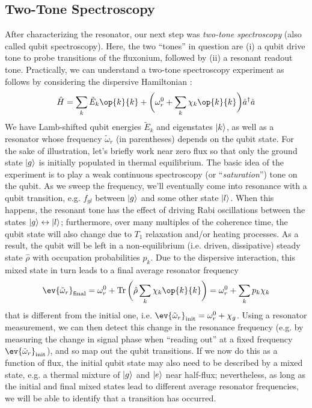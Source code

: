 \subsection{Two-Tone Spectroscopy}
After characterizing the resonator, our next step was \textit{two-tone spectroscopy} (also called qubit spectroscopy). Here, the two ``tones'' in question are (i) a qubit drive tone to probe transitions of the fluxonium, followed by (ii) a resonant readout tone. Practically, we can understand a two-tone spectroscopy experiment as follows by considering the dispersive Hamiltonian \cite{zhu2013cQEDfluxonium}:
\begin{equation}
    \hat{H} = \sum_k \tilde{E}_k \op{k}{k} + \bigg(\omega_r^0 + \sum_k \chi_k \op{k}{k}\bigg) \hat{a}^\dagger\hat{a}
\end{equation}
We have Lamb-shifted qubit energies $\tilde{E}_k$ and eigenstates $\lvert k\rangle$, as well as a resonator whose frequency $\tilde{\omega}_r$ (in parentheses) depends on the qubit state. For the sake of illustration, let's briefly work near zero flux so that only the ground state $\lvert g\rangle$ is initially populated in thermal equilibrium. The basic idea of the experiment is to play a weak continuous spectroscopy (or ``\textit{saturation}'') tone on the qubit. As we sweep the frequency, we'll eventually come into resonance with a qubit transition, e.g. $f_{gl}$ between $\lvert g\rangle$ and some other state $\lvert l\rangle$. When this happens, the resonant tone has the effect of driving Rabi oscillations between the states $\lvert g\rangle \leftrightarrow \lvert l\rangle$; furthermore, over many multiples of the coherence time, the qubit state will also change due to $T_1$ relaxation and/or heating processes. As a result, the qubit will be left in a non-equilibrium (i.e. driven, dissipative) steady state $\hat{\rho}$ with occupation probabilities $p_k$. Due to the dispersive interaction, this mixed state in turn leads to a final average resonator frequency 
\begin{equation}
    \ev{\tilde{\omega}_r}_{\rm final} = \omega_r^0 + \Tr\bigg(\hat{\rho} \sum_k \chi_k \op{k}{k}\bigg) = \omega_r^0 + \sum_k p_k \chi_k
\end{equation}
that is different from the initial one, i.e. $\ev{\tilde{\omega}_r}_{\rm init} = \omega_r^0 + \chi_g$. Using a resonator measurement, we can then detect this change in the resonance frequency (e.g. by measuring the change in signal phase when ``reading out'' at a fixed frequency $\ev{\tilde{\omega}_r}_{\rm init}$), and so map out the qubit transitions. If we now do this as a function of flux, the initial qubit state may also need to be described by a mixed state, e.g. a thermal mixture of $\lvert g\rangle$ and $\lvert e\rangle$ near half-flux; nevertheless, as long as the initial and final mixed states lead to different average resonator frequencies, we will be able to identify that a transition has occurred. 

